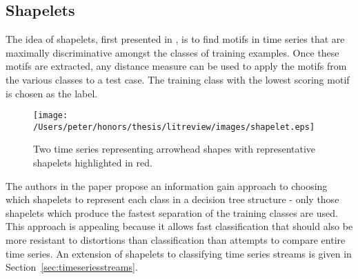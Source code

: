 	\subsection{Shapelets}
	The idea of shapelets, first presented in \citep{ye2009time}, is to find motifs in time series that are maximally discriminative amongst the classes of training examples. Once these motifs are extracted, any distance measure can be used to apply the motifs from the various classes to a test case. The training class with the lowest scoring motif is chosen as the label.
	\begin{figure}[ht!]
	\centering
	\texttt{[image: /Users/peter/honors/thesis/litreview/images/shapelet.eps]}
	\caption{Two time series representing arrowhead shapes with representative shapelets highlighted in red.}
	\label{fig:shapelets}
	\end{figure}
	The authors in the paper propose an information gain approach to choosing which shapelets to represent each class in a decision tree structure - only those shapelets which produce the fastest separation of the training classes are used. This approach is appealing because it allows fast classification that should also be more resistant to distortions than classification than attempts to compare entire time series. An extension of shapelets to classifying time series streams is given in Section~\ref{sec:timeseriesstreams}.

